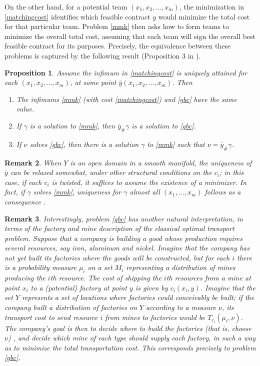 \documentclass[letter,10pt]{article}
\theoremstyle{dotless}
\begin{document}
On the other hand, for a potential team $(x_1,x_2,...,x_m)$,  the minimization in \eqref{matchingcost} identifies which feasible contract $y$ would minimize the total cost for that particular team.  Problem \eqref{mmk} then asks how to form teams to minimize the overall total cost, assuming that each team will sign the overall best feasible contract for its purposes.
Precisely, the equivalence between these problems is captured by the following result (Proposition 3 in \cite{CE}).
\newtheorem{equivalence}{Proposition}[subsection]
\begin{equivalence}\label{equivalence}
Assume the infimum in \eqref{matchingcost} is uniquely attained for each $(x_1,x_2,...,x_m)$, at some point $\bar y(x_1,x_2,...,x_m)$.  Then
\begin{enumerate}
\item The infimums \eqref{mmk} (with cost \eqref{matchingcost}) and \eqref{gbc} have the same value.
\item If $\gamma$ is a solution to \eqref{mmk}, then $\bar y_{\#} \gamma$ is a solution to \eqref{gbc}.
\item If $\nu$ solves \eqref{gbc}, then there is a solution $\gamma$ to \eqref{mmk} such that $\nu =\bar y_{\#} \gamma$.
\end{enumerate}
\end{equivalence}
\newtheorem{relaxassume}[equivalence]{Remark}
\begin{relaxassume}
When $Y$ is an open domain in a smooth manifold, the uniqueness of $\bar y$ can be relaxed somewhat, under other structural conditions on the $c_i$; in this case, if each $c_i$ is twisted, it suffices to assume the existence of a minimizer.  In fact, if $\gamma$ solves \eqref{mmk}, uniqueness for $\gamma$ almost all $(x_1,...,x_m)$ follows as a consequence \cite{KP2}.
\end{relaxassume}
\newtheorem{minesfactories}[equivalence]{Remark}
\begin{minesfactories}
Interestingly, problem \eqref{gbc} has another natural interpretation, in terms of the factory and mine description of the classical optimal transport problem.   Suppose that a company is building a good whose production requires several resources, say iron, aluminum and nickel.  Imagine that the company has not yet built its factories where the goods will be constructed, but for each $i$ there is a probability measure $\mu_i$ on a set $M_i$  representing a distribution of mines producing the $i$th resource.  
The cost of shipping the $i$th resources from a mine at point $x_i$ to a (potential) factory at point $y$ is given by $c_i(x_i,y)$.  Imagine that the set $Y$ represents a set of locations where factories could conceivably be built; if the company built a distribution of factories on $Y$ according to a measure $\nu$, its transport cost to send resource $i$ from mines to factories would be $T_{c_i}(\mu_i,\nu)$. The company's goal is then to decide where to build the factories (that is, choose $\nu$) , and decide which mine of each type should supply each factory, in such a way as to minimize the total transportation cost.   This corresponds precisely to problem \eqref{gbc}.
\end{minesfactories}
\end{document}
